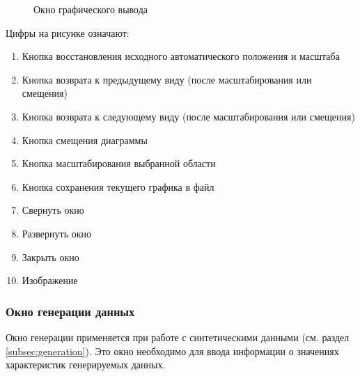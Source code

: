 \documentclass[12pt,tikz]{instruction}
\begin{document}
\begin{figure}[H]
	\centering
	\caption{Окно графического вывода}
	\label{fig:plot-view}
\end{figure}


Цифры на рисунке означают:
\begin{enumerate}
	\item \label{itm:view-control1}Кнопка восстановления исходного автоматического положения и масштаба
	\item Кнопка возврата к предыдущему виду (после масштабирования или смещения)
	\item Кнопка возврата к следующему виду (после масштабирования или смещения)
	\item Кнопка смещения диаграммы
	\item Кнопка масштабирования выбранной области
	\item \label{itm:view-control6}Кнопка сохранения текущего графика в файл
	\item Свернуть окно
	\item Развернуть окно
	\item Закрыть окно 
	\item Изображение
\end{enumerate}

\subsubsection{Окно генерации данных}
Окно генерации применяется при работе с синтетическими данными (см. раздел \ref{subsec:generation}). Это окно необходимо для ввода информации о значениях характеристик генерируемых данных.
\end{document}
